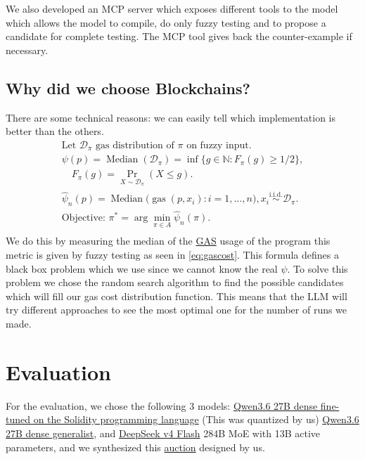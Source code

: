 \documentclass{article}
\begin{document}
We also developed an MCP server which exposes different tools to the model which allows the model to compile, do only fuzzy testing and to propose a candidate for complete testing.
The MCP tool gives back the counter-example if necessary.
\subsection{Why did we choose Blockchains?}
There are some technical reasons: we can easily tell which implementation is better than the others.
\begin{gather*}
	\text{Let } \mathcal{D}_\pi \text{ gas distribution of } \pi \text{ on fuzzy input.} \\
	\psi(p) = \operatorname{Median}(\mathcal{D}_\pi) = \inf\{g \in \mathbb{N} : F_\pi(g) \ge 1/2\},\\
	\quad F_\pi(g) = \Pr_{X \sim \mathcal{D}_\pi}(X \le g). \\
	\hat{\psi}_n(p) = \operatorname{Median}\bigl(\operatorname{gas}(p, x_i) : i=1,\dots,n\bigr) , x_i \overset{\text{i.i.d.}}{\sim} \mathcal{D}_\pi. \\
	\text{Objective: } \pi^* = \arg\min_{\pi \in A} \hat{ \psi }_n(\pi). \\
	\label{eq:gascost}
   \tag{Gas Cost Equation}
\end{gather*}
We do this by measuring the median of the \href{https://ethereum.org/gas/}{GAS} usage of the program this metric is given by fuzzy testing as seen in \ref{eq:gascost}.
This formula defines a black box problem which we use since we cannot know the real $\psi$.
To solve this problem we chose the random search algorithm to find the possible candidates which will fill our gas cost distribution function.
This means that the LLM will try different approaches to see the most optimal one for the number of runs we made.

\section{Evaluation}


For the evaluation, we chose the following 3 models: \href{https://huggingface.co/SoftDream11/Qwen3.6-Solidity-27B-GGUF}{Qwen3.6 27B dense fine-tuned on the Solidity programming language} (This was quantized by us)
\href{https://huggingface.co/unsloth/Qwen3.6-27B-GGUF?show_file_info=Qwen3.6-27B-Q6_K.gguf}{Qwen3.6 27B dense generalist},
and \href{https://huggingface.co/deepseek-ai/DeepSeek-V4-Flash}{DeepSeek v4 Flash} 284B MoE with 13B active parameters, and we synthesized this \href{https://github.com/BobTheBot988/test2/tree/master}{auction} designed by us.
\end{document}
